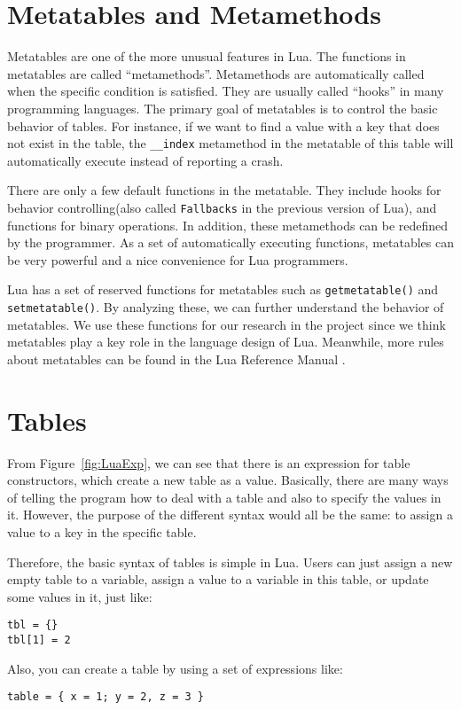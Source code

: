 \section{Metatables and Metamethods}
Metatables are one of the more unusual features in Lua. The functions in metatables are called ``metamethods''. Metamethods are automatically called when the specific condition is satisfied. They are usually called ``hooks'' in many programming languages. The primary goal of metatables is to control the basic behavior of tables. For instance, if we want to find a value with a key that does not exist in the table, the {\tt \_\_index} metamethod in the metatable of this table will automatically execute instead of reporting a crash.

There are only a few default functions in the metatable. They include hooks for behavior controlling(also called {\tt Fallbacks} in the previous version of Lua), and functions for binary operations. In addition, these metamethods can be redefined by the programmer. As a set of automatically executing functions, metatables can be very powerful and a nice convenience for Lua programmers.

Lua has a set of reserved functions for metatables such as {\tt getmetatable()} and {\tt setmetatable()}. By analyzing these, we can further understand the behavior of metatables. We use these functions for our research in the project since we think metatables play a key role in the language design of Lua. Meanwhile, more rules about metatables can be found in the Lua Reference Manual \cite{LRM}.

\section{Tables}\label{sec: LuaTable}
From Figure~\ref{fig:LuaExp}, we can see that there is an expression for table constructors, which create a new table as a value. Basically, there are many ways of telling the program how to deal with a table and also to specify the values in it. However, the purpose of the different syntax would all be the same: to assign a value to a key in the specific table.

Therefore, the basic syntax of tables is simple in Lua. Users can just assign a new empty table to a variable, assign a value to a variable in this table, or update some values in it, just like:

\begin{verbatim}
tbl = {}
tbl[1] = 2 
\end{verbatim}
Also, you can create a table by using a set of expressions like:
\begin{verbatim}
table = { x = 1; y = 2, z = 3 } 
\end{verbatim}

